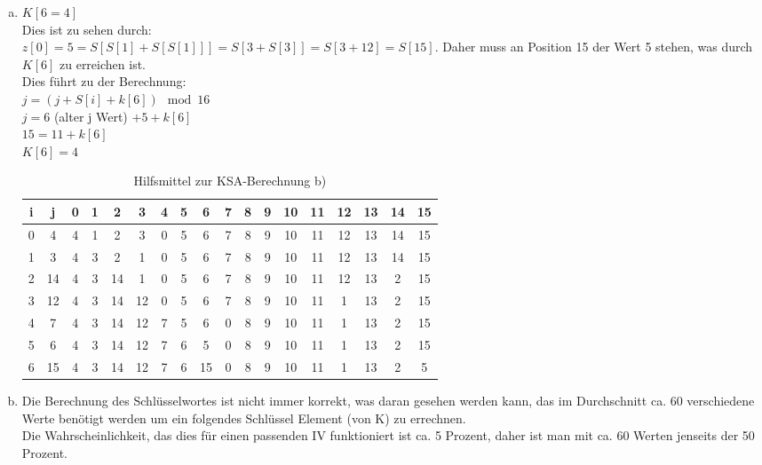 \documentclass[12pt.twoside,a4paper,notitlepage]{article}
\begin{document}
\begin{enumerate}[a)]
\item $K[6=4]$\\
Dies ist zu sehen durch: \\
$z[0]=5=S[S[1]+S[S[1]]]=S[3+S[3]]=S[3+12]=S[15]$. Daher muss an Position 15 der Wert 5 stehen, was durch $K[6]$ zu 
erreichen ist.\\
Dies führt zu der Berechnung: \\
$j = (j + S[i] + k[6]) \mod 16 $\\
$j = 6 $ (alter j Wert) $+ 5 + k[6]$ \\
$15 = 11 + k[6]$\\
$K[6] = 4 $
\begin{table}[h]
\centering
\begin{tabular}{|c|c||c|c|c|c|c|c|c|c|c|c|c|c|c|c|c|c|}
\hline
i & j & 0 & 1 & 2 & 3 & 4 & 5 & 6 & 7 & 8 & 9 & 10 & 11 & 12 & 13 & 14 & 15 \\
\hline
0 & 4 & 4 & 1 & 2 & 3 & 0 & 5 & 6 & 7 & 8 & 9 & 10 & 11 & 12 & 13 & 14 & 15 \\
\hline
1 & 3 & 4 & 3 & 2 & 1 & 0 & 5 & 6 & 7 & 8 & 9 & 10 & 11 & 12 & 13 & 14 & 15 \\
\hline
2 & 14 & 4 & 3 & 14 & 1 & 0 & 5 & 6 & 7 & 8 & 9 & 10 & 11 & 12 & 13 & 2 & 15 \\
\hline
3 & 12 & 4 & 3 & 14 & 12 & 0 & 5 & 6 & 7 & 8 & 9 & 10 & 11 & 1 & 13 & 2 & 15 \\
\hline
4 & 7 & 4 & 3 & 14 & 12 & 7 & 5 & 6 & 0 & 8 & 9 & 10 & 11 & 1 & 13 & 2 & 15 \\
\hline
5 & 6 & 4 & 3 & 14 & 12 & 7 & 6 & 5 & 0 & 8 & 9 & 10 & 11 & 1 & 13 & 2 & 15 \\
\hline
6 & 15 & 4 & 3 & 14 & 12 & 7 & 6 & 15 & 0 & 8 & 9 & 10 & 11 & 1 & 13 & 2 & 5 \\
\hline
\end{tabular}
\caption{Hilfsmittel zur KSA-Berechnung b)}
\label{tab:ksa}
\end{table}

\item %

Die Berechnung des Schlüsselwortes ist nicht immer korrekt, was daran gesehen werden kann, das im Durchschnitt ca. 60
verschiedene Werte benötigt werden um ein folgendes Schlüssel Element (von K) zu errechnen.\\
Die Wahrscheinlichkeit, das dies für einen passenden IV funktioniert ist ca. 5 Prozent, daher ist man mit ca. 60 Werten jenseits der 50 Prozent.\\

\end{enumerate}
\end{document}
